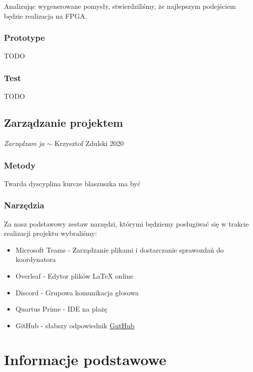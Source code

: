 \documentclass{article}
\begin{document}
Analizując wygenerowane pomysły, stwierdziliśmy, że najlepszym podejściem będzie realizacja na FPGA.

\subsubsection{Prototype}
\label{sec:prototype}

TODO

\subsubsection{Test}
\label{sec:test}

TODO

\subsection{Zarządzanie projektem}
\label{sec:zarządzanie_projektem}

\textit{Zarządzam ja} $\sim$ Krzysztof Zdulski 2020

\subsubsection{Metody}
\label{sec:narzędzia}
Twarda dyscyplina kurcze blaszuszka ma być

\subsubsection{Narzędzia}
\label{sec:narzędzia}
Za nasz podstawowy zestaw narzędzi, którymi będziemy posługiwać się w trakcie realizacji projektu wybraliśmy:
\begin{itemize}
    \item Microsoft Teams - Zarządzanie plikami i dostarczanie sprawozdań do koordynatora
    \item Overleaf - Edytor plików LaTeX online
    \item Discord - Grupowa komunikacja głosowa
    \item Quartus Prime - IDE na plażę
    \item GitHub - słabszy odpowiednik \href{https://guthub.net/}{GutHub}
\end{itemize}
\section{Informacje podstawowe}
\label{sec:informacje_podstawowe}
\end{document}
